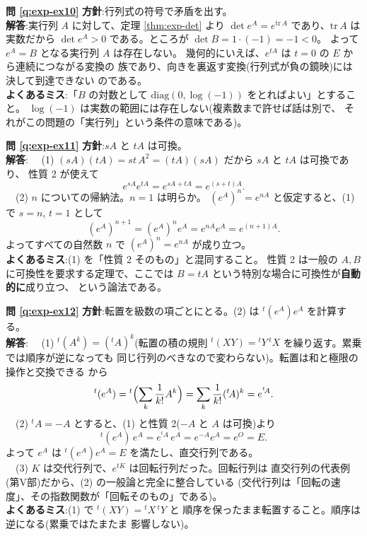 \bigskip
\noindent\textbf{問 \ref{q:exp-ex10}}\quad
\textbf{方針}:行列式の符号で矛盾を出す。\\
\textbf{解答}:実行列 $A$ に対して、定理 \ref{thm:exp-det} より
$\det e^{A} = e^{\mathrm{tr}\,A}$ であり、$\mathrm{tr}\,A$ は実数だから
$\det e^{A} > 0$ である。ところが $\det B = 1 \cdot (-1) = -1 < 0$。
よって $e^{A} = B$ となる実行列 $A$ は存在しない。
幾何的にいえば、$e^{tA}$ は $t = 0$ の $E$ から連続につながる変換の
族であり、向きを裏返す変換(行列式が負の鏡映)には決して到達できない
のである。\\
\textbf{よくあるミス}:「$B$ の対数として
$\mathrm{diag}(0, \log(-1))$ をとればよい」とすること。
$\log(-1)$ は実数の範囲には存在しない(複素数まで許せば話は別で、
それがこの問題の「実行列」という条件の意味である)。

\bigskip
\noindent\textbf{問 \ref{q:exp-ex11}}\quad
\textbf{方針}:$sA$ と $tA$ は可換。\\
\textbf{解答}:
　(1) $(sA)(tA) = st\,A^2 = (tA)(sA)$ だから $sA$ と $tA$ は可換であり、
性質 2 が使えて
\[
e^{sA}e^{tA} = e^{sA + tA} = e^{(s+t)A}.
\]
　(2) $n$ についての帰納法。$n = 1$ は明らか。
$(e^{A})^n = e^{nA}$ と仮定すると、(1) で $s = n$, $t = 1$ として
\[
(e^{A})^{n+1} = (e^{A})^n e^{A} = e^{nA}e^{A} = e^{(n+1)A}.
\]
よってすべての自然数 $n$ で $(e^{A})^n = e^{nA}$ が成り立つ。\\
\textbf{よくあるミス}:(1) を「性質 2 そのもの」と混同すること。
性質 2 は一般の $A, B$ に可換性を要求する定理で、ここでは
$B = tA$ という特別な場合に可換性が\textbf{自動的に}成り立つ、
という論法である。

\bigskip
\noindent\textbf{問 \ref{q:exp-ex12}}\quad
\textbf{方針}:転置を級数の項ごとにとる。(2) は
${}^t(e^{A})e^{A}$ を計算する。\\
\textbf{解答}:
　(1) ${}^t(A^k) = ({}^t\!A)^k$(転置の積の規則
${}^t(XY) = {}^t Y\,{}^t\!X$ を繰り返す。累乗では順序が逆になっても
同じ行列のべきなので変わらない)。転置は和と極限の操作と交換できる
から
\[
{}^t(e^{A}) = {}^t\Bigl(\sum_{k} \frac{1}{k!}A^k\Bigr)
= \sum_{k} \frac{1}{k!}({}^t\!A)^k = e^{{}^t\!A}.
\]
　(2) ${}^t\!A = -A$ とすると、(1) と性質 2($-A$ と $A$ は可換)より
\[
{}^t(e^{A})\,e^{A} = e^{{}^t\!A}\,e^{A} = e^{-A}e^{A} = e^{O} = E.
\]
よって $e^{A}$ は ${}^t(e^{A})e^{A} = E$ を満たし、直交行列である。\\
　(3) $K$ は交代行列で、$e^{tK}$ は回転行列だった。回転行列は
直交行列の代表例(第V部)だから、(2) の一般論と完全に整合している
(交代行列は「回転の速度」、その指数関数が「回転そのもの」である)。\\
\textbf{よくあるミス}:(1) で ${}^t(XY) = {}^t\!X\,{}^t Y$ と
順序を保ったまま転置すること。順序は逆になる(累乗ではたまたま
影響しない)。

